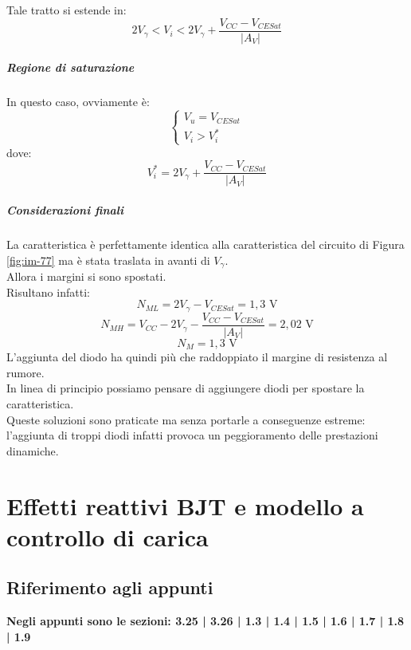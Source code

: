 \documentclass{article}
\numberwithin{equation}{subsection}
\begin{document}
	Tale tratto si estende in:
	$$2V_\gamma < V_i < 2V_\gamma + \frac{V_{CC} - V_{CESat}}{|A_V|}$$
	\subparagraph{Regione di saturazione} 
	In questo caso, ovviamente è:
	$$\begin{cases} V_u = V_{CESat} \\ V_i > V_i^* \end{cases}$$
	dove:
	$$V_i^* = 2V_\gamma + \frac{V_{CC} - V_{CESat}}{|A_V|}$$
	\subparagraph{Considerazioni finali} 
	La caratteristica è perfettamente identica alla caratteristica del circuito di Figura \ref{fig:im-77} ma è stata traslata in avanti di $V_\gamma$. \\
	Allora i margini si sono spostati. \\
	Risultano infatti:
	$$N_{ML} = 2V_\gamma - V_{CESat} = 1,3 \text{ V}$$
	$$N_{MH} = V_{CC} - 2V_\gamma - \frac{V_{CC} - V_{CESat}}{|A_V|} = 2,02 \text{ V}$$
	$$N_M = 1,3 \text{ V}$$
	L’aggiunta del diodo ha quindi più che raddoppiato il margine di resistenza al rumore. \\
	In linea di principio possiamo pensare di aggiungere diodi per spostare la caratteristica. \\
	Queste soluzioni sono praticate ma senza portarle a conseguenze estreme: l’aggiunta di troppi diodi infatti provoca un peggioramento delle prestazioni dinamiche.
	\section{Effetti reattivi BJT e modello a controllo di carica}
	\subsection{Riferimento agli appunti}
	\textbf{Negli appunti sono le sezioni: 3.25 | 3.26 | 1.3 | 1.4 | 1.5 | 1.6 | 1.7 | 1.8 | 1.9}
\end{document}
